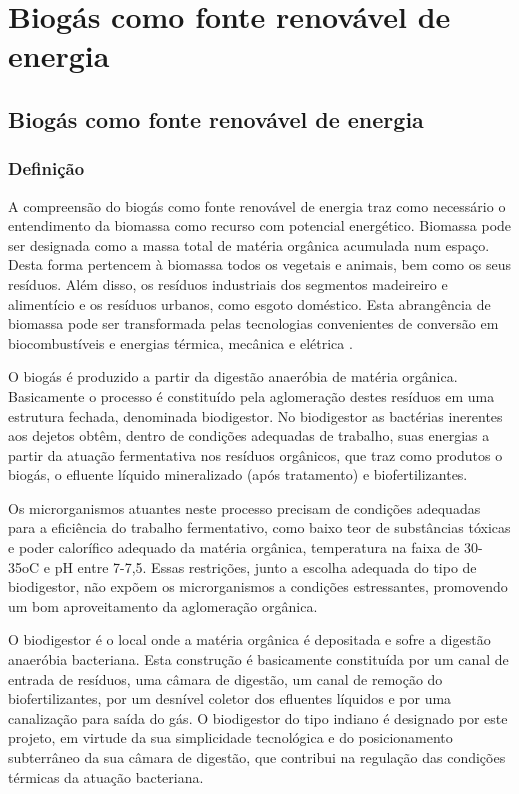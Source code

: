 \part{Biogás como fonte renovável de energia}
\chapter[Biogás como fonte renovável de energia]{Biogás como fonte renovável de energia}
\section {Definição}

A compreensão do biogás como fonte renovável de energia traz como necessário o entendimento da biomassa como recurso com potencial energético. Biomassa pode ser designada como a massa total de matéria orgânica acumulada num espaço. Desta forma pertencem à biomassa todos os vegetais e animais, bem como os seus resíduos. Além disso, os resíduos industriais dos segmentos madeireiro e alimentício e os resíduos urbanos, como esgoto doméstico. Esta abrangência de biomassa pode ser transformada pelas tecnologias convenientes de conversão em biocombustíveis e energias térmica, mecânica e elétrica \cite{staiss2001biomassa}.
\par O biogás é produzido a partir da digestão anaeróbia de matéria orgânica. Basicamente o processo é constituído pela aglomeração destes resíduos em uma estrutura fechada, denominada biodigestor. No biodigestor as bactérias inerentes aos dejetos obtêm, dentro de condições adequadas de trabalho, suas energias a partir da atuação fermentativa nos resíduos orgânicos, que traz como produtos o biogás, o efluente líquido mineralizado (após tratamento) e biofertilizantes.
\par Os microrganismos atuantes neste processo precisam de condições adequadas para a eficiência do trabalho fermentativo, como baixo teor de substâncias tóxicas e poder calorífico adequado da matéria orgânica, temperatura na faixa de 30-35oC e pH entre 7-7,5. Essas restrições, junto a escolha adequada do tipo de biodigestor, não expõem os microrganismos a condições estressantes, promovendo um bom aproveitamento da aglomeração orgânica.
\par O biodigestor é o local onde a matéria orgânica é depositada e sofre a digestão anaeróbia bacteriana. Esta construção é basicamente constituída por um canal de entrada de resíduos, uma câmara de digestão, um canal de remoção do biofertilizantes, por um desnível coletor dos efluentes líquidos e por uma canalização para saída do gás. O biodigestor do tipo indiano é designado por este projeto, em virtude da sua simplicidade tecnológica e do posicionamento subterrâneo da sua câmara de digestão, que contribui na regulação das condições térmicas da atuação bacteriana.
